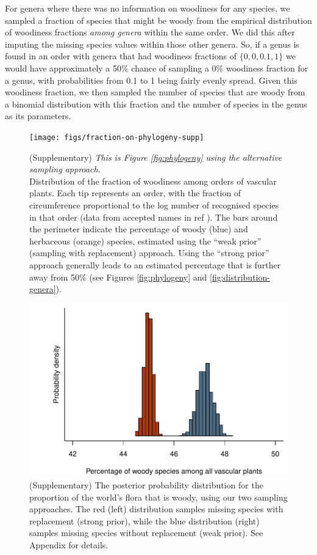 \documentclass[12pt]{article}
\begin{document}
For genera where there was no information on woodiness for any
species, we sampled a fraction of species that might be woody from the
empirical distribution of woodiness fractions \textit{among genera}
within the same order. We did this after imputing the missing species
values within those other genera. So, if a genus is found in an order
with genera that had woodiness fractions of $\{0, 0, 0.1, 1\}$ we would
have approximately a 50\% chance of sampling a 0\% woodiness fraction
for a genus, with probabilities from 0.1 to 1 being fairly evenly
spread.  Given this woodiness fraction, we then sampled the number of
species that are woody from a binomial distribution with this fraction
and the number of species in the genus as its parameters.

\begin{figure}[p]
  \centering
  \texttt{[image: figs/fraction-on-phylogeny-supp]}

  \caption{(Supplementary)
    \textit{This is Figure \ref{fig:phylogeny} using the alternative
      sampling approach.}\\
    Distribution of the fraction of woodiness among orders of vascular
    plants.  Each tip represents an order, with the fraction of
    circumference proportional to the log number of recognised species
    in that order (data from accepted names in ref
    \citep{ThePlantList}).  The bars around the perimeter indicate the
    percentage of woody (blue) and herbaceous (orange) species,
    estimated using the ``weak prior'' (sampling with replacement)
    approach.  Using the ``strong prior'' approach generally leads to
    an estimated percentage that is further away from 50\% (see
    Figures \ref{fig:phylogeny} and \ref{fig:distribution-genera}).}
  \label{fig:phylogeny-supp}
\end{figure}

\begin{figure}[p]
  \centering
  \includegraphics{figs/distribution-raw}  
  \caption{(Supplementary) The posterior probability distribution for
    the proportion of the world's flora that is woody, using our two
    sampling approaches.  The red (left) distribution samples missing species
    with replacement (strong prior), while the blue distribution
    (right) samples missing species without replacement (weak prior).
    See Appendix for details.}
  \label{fig:distribution-raw}
\end{figure}
\end{document}
